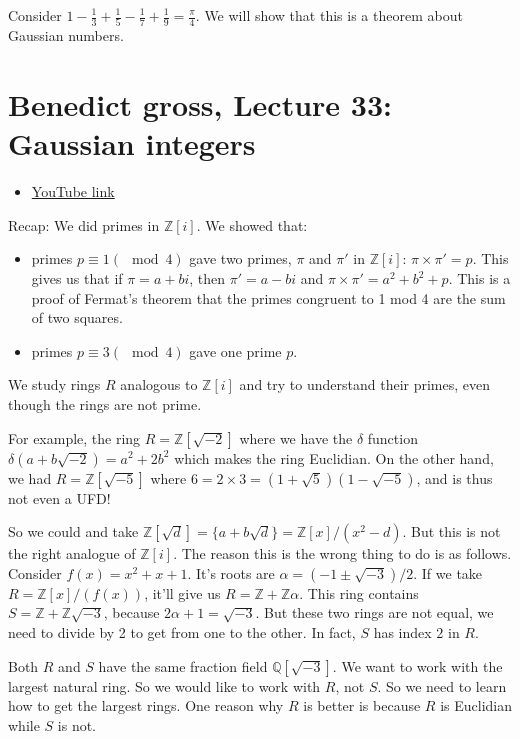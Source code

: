 \documentclass{book}
\newcommand{\Z}{\ensuremath{\mathbb{Z}}}
\newcommand{\Q}{\ensuremath{\mathbb{Q}}}
\theoremstyle{definition}
\begin{document}
Consider $1 - \frac{1}{3} + \frac{1}{5} - \frac{1}{7} + \frac{1}{9} = \frac{\pi}{4}$.
We will show that this is a theorem about Gaussian numbers.


\chapter{Benedict gross, Lecture 33: Gaussian integers}
\begin{itemize}
    \item \href{https://www.youtube.com/watch?v=TsLWvWf4RdY&list=PLelIK3uylPMGzHBuR3hLMHrYfMqWWsmx5&index=33}{YouTube link}
\end{itemize}


Recap: We did primes in $\Z[i]$. We showed that:
\begin{itemize}
    \item primes $p \equiv 1 (\mod 4)$ gave two primes, $\pi$ and $\pi'$ in $\Z[i]$: $\pi \times \pi' = p$.
         This gives us that if $\pi = a + bi$, then $\pi' = a - bi$ and $\pi \times \pi' = a^2 + b^2 + p$.
         This is a proof of Fermat's theorem that the primes congruent to 1 mod 4 are the sum of
         two squares.
    \item primes $p \equiv 3 (\mod 4)$ gave one prime $p$.
\end{itemize}

We study rings $R$ analogous to $\Z[i]$ and try to understand their primes,
even though the rings are not prime.

For example, the ring $R = \Z[\sqrt{-2}]$ where we have the $\delta$ function
$\delta(a + b \sqrt{-2}) = a^2 + 2b^2$ which makes the ring Euclidian.
On the other hand, we had $R = \Z[\sqrt{-5}]$ where
$6 = 2 \times 3 = (1 + \sqrt{5})(1 - \sqrt{-5})$, and is thus not even
a UFD!                                                                                  


So we could and take $\Z[\sqrt{d}] = \{ a + b \sqrt{d} \} = \Z[x] / (x^2 - d)$.
But this is not the right analogue of $\Z[i]$. The reason this is the wrong
thing to do is as follows. Consider $f(x) = x^2 + x + 1$. It's roots
are $\alpha = (-1 \pm \sqrt{-3})/2$. If we take $R = \Z[x]/(f(x))$, it'll give
us $R = \Z + \Z\alpha$. This ring contains $S = \Z + \Z\sqrt{-3}$, because $2\alpha + 1 = \sqrt{-3}$.
But these two rings are not equal, we need to divide by 2 to get from one
to the other. In fact, $S$ has index $2$ in $R$.

Both $R$ and $S$ have the same fraction field $\Q[\sqrt{-3}]$. We want
to work with the largest natural ring. So we would like to work with
$R$, not $S$. So we need to learn how to get the largest rings. One reason
why $R$ is better is because $R$ is Euclidian while $S$ is not.
\end{document}
